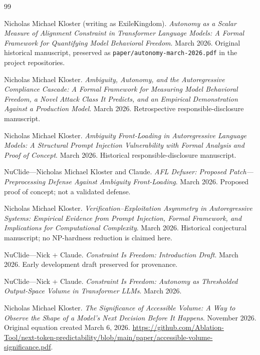 \clearpage
\begin{thebibliography}{99}

Nicholas Michael Kloster (writing as ExileKingdom).
\newblock \emph{Autonomy as a Scalar Measure of Alignment Constraint in Transformer Language Models: A Formal Framework for Quantifying Model Behavioral Freedom}.
\newblock March 2026. Original historical manuscript, preserved as \texttt{paper/autonomy-march-2026.pdf} in the project repositories.

Nicholas Michael Kloster.
\newblock \emph{Ambiguity, Autonomy, and the Autoregressive Compliance Cascade: A Formal Framework for Measuring Model Behavioral Freedom, a Novel Attack Class It Predicts, and an Empirical Demonstration Against a Production Model}.
\newblock March 2026. Retrospective responsible-disclosure manuscript.

Nicholas Michael Kloster.
\newblock \emph{Ambiguity Front-Loading in Autoregressive Language Models: A Structural Prompt Injection Vulnerability with Formal Analysis and Proof of Concept}.
\newblock March 2026. Historical responsible-disclosure manuscript.

NuClide---Nicholas Michael Kloster and Claude.
\newblock \emph{AFL Defuser: Proposed Patch---Preprocessing Defense Against Ambiguity Front-Loading}.
\newblock March 2026. Proposed proof of concept; not a validated defense.

Nicholas Michael Kloster.
\newblock \emph{Verification--Exploitation Asymmetry in Autoregressive Systems: Empirical Evidence from Prompt Injection, Formal Framework, and Implications for Computational Complexity}.
\newblock March 2026. Historical conjectural manuscript; no NP-hardness reduction is claimed here.

NuClide---Nick + Claude.
\newblock \emph{Constraint Is Freedom: Introduction Draft}.
\newblock March 2026. Early development draft preserved for provenance.

NuClide---Nick + Claude.
\newblock \emph{Constraint Is Freedom: Autonomy as Thresholded Output-Space Volume in Transformer LLMs}.
\newblock March 2026.

Nicholas Michael Kloster.
\newblock \emph{The Significance of Accessible Volume: A Way to Observe the Shape of a Model's Next Decision Before It Happens}.
\newblock November 2026. Original equation created March 6, 2026.
\newblock \url{https://github.com/Ablation-Tool/next-token-predictability/blob/main/paper/accessible-volume-significance.pdf}.


\end{thebibliography}
